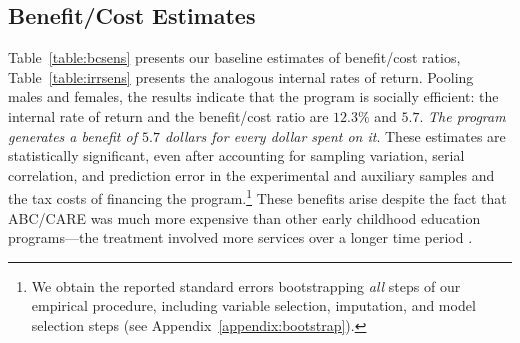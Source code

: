 \subsection{Benefit/Cost Estimates}

Table~\ref{table:bcsens} presents our baseline estimates of benefit/cost ratios, Table~\ref{table:irrsens} presents the analogous internal rates of return. Pooling males and females, the results indicate that the program is socially efficient: the internal rate of return and the benefit/cost ratio are $12.3\%$ and $5.7$. \textit{The program generates a benefit of $5.7$ dollars for every dollar spent on it}. These estimates are statistically significant, even after accounting for sampling variation, serial correlation, and prediction error in the experimental and auxiliary samples and the tax costs of financing the program.\footnote{We obtain the reported standard errors bootstrapping \emph{all} steps of our empirical procedure, including variable selection, imputation, and model selection steps (see Appendix~\ref{appendix:bootstrap}).} These benefits arise despite the fact that ABC/CARE was much more expensive than other early childhood education programs---the treatment involved more services over a longer time period \citep{Elango_Hojman_etal_2016_Early-Edu}.

